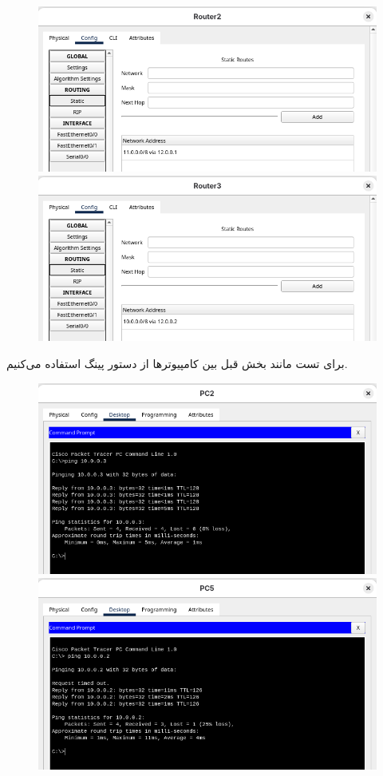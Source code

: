 \begin{figure}[h]
    \centering
    \includegraphics[width=1\textwidth]{img/26.png}
    \includegraphics[width=1\textwidth]{img/27.png}
\end{figure}

\clearpage
برای تست مانند بخش قبل بین کامپیوترها از دستور پینگ استفاده می‌کنیم.
\begin{figure}[h]
    \centering
    \includegraphics[width=1\textwidth]{img/24.png}
    \includegraphics[width=1\textwidth]{img/25.png}
\end{figure}

